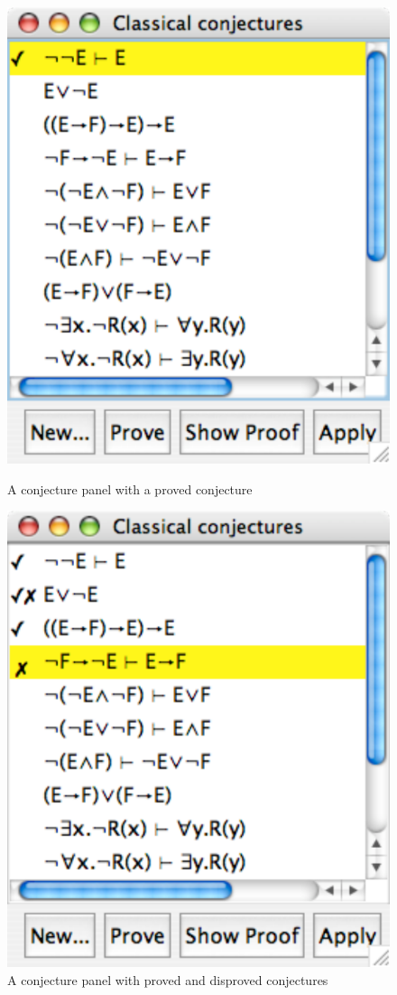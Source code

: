 \documentclass[11pt]{book}
\begin{document}
\begin{figure}
\centering
\parbox[b]{200pt}{\centering
\includegraphics[scale=0.5]{pics/provedconjecture}
\caption{A conjecture panel with a proved conjecture}
\label{fig:provedconjecture}}
\qquad
\parbox[b]{200pt}{\centering
\includegraphics[scale=0.5]{pics/decoratedpanel}
\caption{A conjecture panel with proved and disproved conjectures}
\label{fig:decoratedpanel}}
\end{figure}
\end{document}
